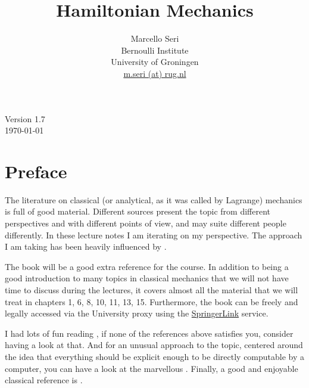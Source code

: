 \documentclass[english,fontsize=11pt,paper=a5,oneside]{scrbook}
\title{Hamiltonian Mechanics}
\author{Marcello Seri\\
\small{Bernoulli Institute}\vspace{-.2cm}\\
\small{University of Groningen}\vspace{-.2cm}\\
\small\href{mailto:m.seri@rug.nl}{m.seri (at) rug.nl}
}
\date{}
\theoremstyle{definition}
\def\biblio{}
\begin{document}
\def\biblio{}

\maketitle

\cleardoublepage

\thispagestyle{empty}
\null\vfill
\begin{center}
  Version 1.7\\
  \today
\end{center}
\vfill
\small{\doclicenseThis}

\cleardoublepage

\tableofcontents

\cleardoublepage

\chapter*{Preface}

The literature on classical (or analytical, as it was called by Lagrange) mechanics is full of good material.
Different sources present the topic from different perspectives and with different points of view, and may suite different people differently.
In these lecture notes I am iterating on my perspective.
The approach I am taking has been heavily influenced by \cite{book:arnold, book:knauf, lectures:dubrovin, book:lowenstein, book:marsdenratiu, lectures:tong, landau1976mechanics}.

The book \cite{book:knauf} will be a good extra reference for the course. In addition to being a good introduction to many topics in classical mechanics that we will not have time to discuss during the lectures, it covers almost all the material that we will treat in chapters 1, 6, 8, 10, 11, 13, 15. Furthermore, the book can be freely and legally accessed via the University proxy using the \href{https://link.springer.com/book/10.1007%2F978-3-662-55774-7}{SpringerLink} service.

I had lots of fun reading \cite{schwichtenberg2019no}, if none of the references above satisfies you, consider having a look at that. And for an unusual approach to the topic, centered around the idea that everything should be explicit enough to be directly computable by a computer, you can have a look at the marvellous \cite{book:sicm}. Finally, a good and enjoyable classical reference is \cite{goldstein2013classical}.\medskip
\end{document}
